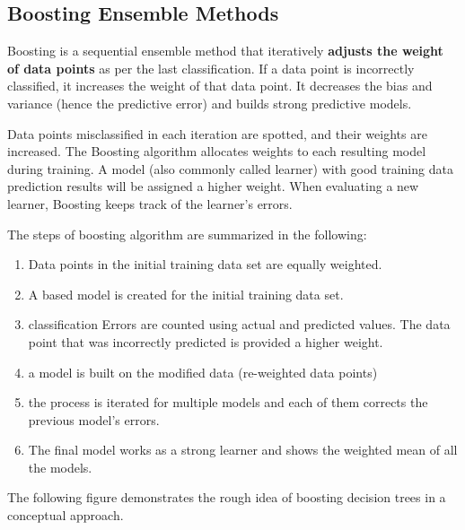 \documentclass[
]{book}
\begin{document}
\hypertarget{boosting-ensemble-methods}{%
\subsection{Boosting Ensemble Methods}\label{boosting-ensemble-methods}}

Boosting is a sequential ensemble method that iteratively \textbf{adjusts the weight of data points} as per the last classification. If a data point is incorrectly classified, it increases the weight of that data point. It decreases the bias and variance (hence the predictive error) and builds strong predictive models.

Data points misclassified in each iteration are spotted, and their weights are increased. The Boosting algorithm allocates weights to each resulting model during training. A model (also commonly called learner) with good training data prediction results will be assigned a higher weight. When evaluating a new learner, Boosting keeps track of the learner's errors.

The steps of boosting algorithm are summarized in the following:

\begin{enumerate}
\def\labelenumi{\arabic{enumi}.}
\item
  Data points in the initial training data set are equally weighted.
\item
  A based model is created for the initial training data set.
\item
  classification Errors are counted using actual and predicted values. The data point that was incorrectly predicted is provided a higher weight.
\item
  a model is built on the modified data (re-weighted data points)
\item
  the process is iterated for multiple models and each of them corrects the previous model's errors.
\item
  The final model works as a strong learner and shows the weighted mean of all the models.
\end{enumerate}

The following figure demonstrates the rough idea of boosting decision trees in a conceptual approach.
\end{document}
